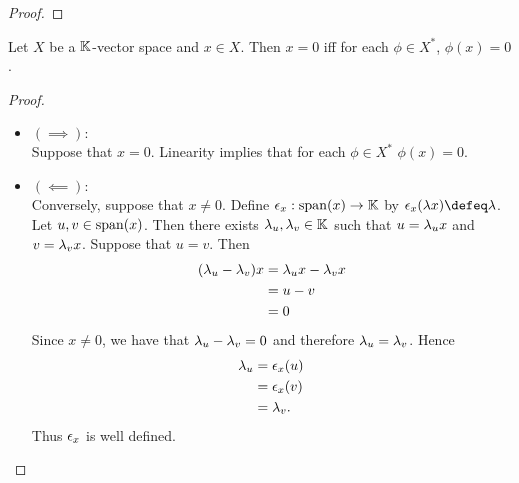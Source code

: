 \documentclass{book}
\begin{document}
	\begin{proof}
		
	\end{proof}

	\begin{ex}
		
	\end{ex}


	\begin{ex}
		Let $X$ be a $\mathbb{K}$-vector space and $x \in X$. Then $x = 0$ iff for each $\phi \in X^*$, $\phi(x) = 0$. 
	\end{ex}

	\begin{proof}\
		\begin{itemize}
			\item $(\implies):$ \\
			Suppose that $x = 0$. Linearity implies that for each $\phi \in X^*$ $\phi(x) = 0$. 
			\item $(\impliedby):$ \\
			Conversely, suppose that $x \neq 0$. Define $\epsilon_x: \operatorname{span}(x) \rightarrow \mathbb{K}$ by $\ep_x(\lam x) \defeq \lam$. Let $u,v \in \operatorname{span}(x)$. Then there exists $\lambda_u, \lambda_v \in \mathbb{K}$ such that $u = \lambda_u x$ and $v = \lambda_v x$. Suppose that $u = v$. Then 
			\begin{align*}
				(\lambda_u - \lambda_v)x
				& = \lambda_u x - \lambda_v x \\
				& = u - v \\
				& = 0
			\end{align*}
			Since $x \neq 0$, we have that $\lambda_u - \lambda_v = 0$ and therefore $\lambda_u = \lambda_v$. Hence  
			\begin{align*}
				\lambda_u 
				& = \epsilon_x(u) \\
				& = \epsilon_x(v) \\
				& = \lambda_v.
			\end{align*}
			Thus $\epsilon_x$ is well defined. 
		\end{itemize}
	\end{proof}
\end{document}
